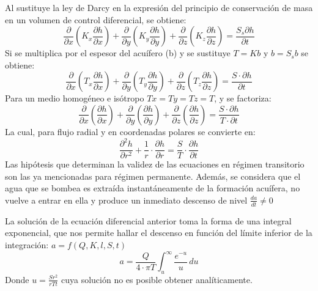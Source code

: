Al sustituye la ley de Darcy en la expresión del principio de conservación de masa en un volumen de control diferencial, se obtiene:
\begin{equation}
    \frac{\partial }{\partial x} \left(K_x \frac{\partial h}{\partial x} \right) + \frac{\partial }{\partial y} \left(K_y \frac{\partial h}{\partial y} \right) + \frac{\partial }{\partial z} \left(K_z \frac{\partial h}{\partial z} \right) = \frac{S_s \partial h}{\partial t}
\end{equation}
Si se multiplica por el espesor del acuífero (b) y se sustituye $T=Kb$ y $b= S_s b$ se obtiene:
\begin{equation*}
    \frac{\partial }{\partial x} \left(T_x \frac{\partial h}{\partial x} \right) + \frac{\partial }{\partial y} \left(T_y \frac{\partial h}{\partial y} \right) + \frac{\partial }{\partial z} \left(T_z \frac{\partial h}{\partial z} \right) = \frac{S \cdot \partial h}{\partial t} 
\end{equation*}
Para un medio homogéneo e isótropo $Tx = Ty = Tz = T$, y se factoriza:
\begin{equation*}
    \frac{\partial }{\partial x} \left(\frac{\partial h}{\partial x} \right) + \frac{\partial }{\partial y} \left(\frac{\partial h}{\partial y} \right) + \frac{\partial }{\partial z} \left(\frac{\partial h}{\partial z} \right) = \frac{S \cdot \partial h}{T \cdot \partial t} 
\end{equation*}
La cual, para flujo radial y en coordenadas polares se convierte en:
\begin{equation*}
    \frac{\partial^2 h}{\partial r^2} + \frac{1}{r} \cdot  \frac{\partial h}{\partial r} = \frac{S}{T} \cdot \frac{\partial h}{\partial t} 
\end{equation*}
Las hipótesis que determinan la validez de las ecuaciones en régimen transitorio son las ya mencionadas para régimen permanente. Además, se considera que el agua que se bombea es extraída instantáneamente de la formación acuífera, no vuelve a entrar en ella y produce un inmediato descenso de nivel $\frac{da}{dt}\neq 0$

La solución de la ecuación diferencial anterior toma la forma de una integral exponencial,
que nos permite hallar el descenso en función del límite inferior de la integración: $a= f (Q , K, l , S , t)$
\begin{equation}
    a = \frac{Q}{4 \cdot \pi T} \int_{u}^{\infty} \frac{e^{ - u}}{u}\, du
\end{equation}
Donde $u=\frac{Sr^2}{rTt}$ cuya solución no es posible obtener analíticamente.

